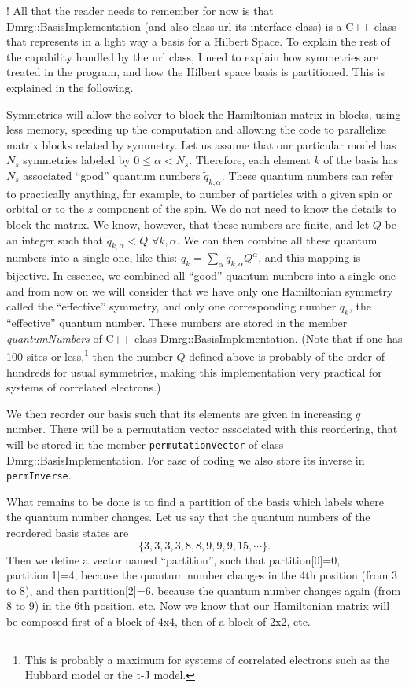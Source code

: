 \documentclass[paper=letter]{scrartcl}
\newcommand{\cppClass}[1]{{\sffamily #1}}
\begin{document}
! All that the reader needs to remember for now is that \cppClass{Dmrg::BasisImplementation} (and also class \cppClass{url} its interface class) is a C++ class that represents in a light way a basis for a Hilbert Space. To explain the rest of the capability handled by the \cppClass{url} class, I need to explain how symmetries are treated in the program, and how the Hilbert space basis is partitioned. This is explained in the following.

Symmetries will allow the solver to block the Hamiltonian matrix in blocks, using less memory, speeding up the computation and allowing the code to parallelize matrix blocks related by symmetry. Let us assume that our particular model has $N_s$ symmetries labeled by $0\le \alpha < N_s$. Therefore, each element $k$ of the basis has $N_s$ associated ``good'' quantum numbers $\tilde{q}_{k,\alpha}$. These quantum numbers can refer to practically anything, for example, to number of particles with a given spin or orbital or to the $z$ component of the spin. We do not need to know the details to block the matrix. We know, however, that these numbers are finite, and let $Q$ be an integer such that $\tilde{q}_{k,\alpha}< Q$ $\forall k,\alpha$. We can then combine all these quantum numbers into a single one, like this: $q_k = \sum_\alpha \tilde{q}_{k,\alpha} Q^\alpha$, and this mapping is bijective. In essence, we combined all ``good'' quantum numbers into a single one and from now on we will consider that we have only one Hamiltonian symmetry called the ``effective'' symmetry, and only one corresponding number $q_k$, the ``effective'' quantum number. These numbers are stored in the member {\it quantumNumbers} of C++ class \cppClass{Dmrg::BasisImplementation}. (Note that if one has 100 sites or less,\footnote{This is probably a maximum for systems of correlated electrons such as the Hubbard model or the t-J model.} then the number $Q$ defined above is probably of the order of hundreds for usual symmetries, making this implementation very practical for systems of correlated electrons.)

We then reorder our basis such that its elements are given in increasing $q$ number. There will be a permutation vector associated with this reordering, that will be stored in the member \verb!permutationVector! of class \cppClass{Dmrg::BasisImplementation}. For ease of coding we also store its inverse in \verb!permInverse!.

What remains to be done is to find a partition of the basis which labels where the quantum number changes. Let us say that the quantum numbers of the reordered basis states are \[ \{3,3,3,3,8,8,9,9,9,15,\cdots\}. \] Then we define a vector named ``partition'', such that partition[0]=0, partition[1]=4, because the quantum number changes in the 4th position (from 3 to 8), and then partition[2]=6, because the quantum number changes again (from 8 to 9) in the 6th position, etc. Now we know that our Hamiltonian matrix will be composed first of a block of 4x4, then of a block of 2x2, etc.
\end{document}
